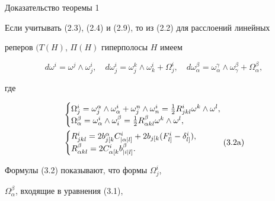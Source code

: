 \begin{pf*}{Доказательство теоремы 1} 


Если учитывать (2.3), (2.4) и (2.9), то из (2.2) для расслоений линейных 


реперов $(T(H)$, $\Pi(H)$ гиперполосы $H$ имеем 


\begin{equation} 


d\omega^i=\omega^j\wedge\omega^i_j,\quad 


d\omega^i_j=\omega^k_j\wedge\omega^i_k+\Omega^i_j,\quad 


d\omega^\beta_\alpha=\omega^\gamma_\alpha\wedge 


\omega^\beta_\gamma+\Omega^\beta_\alpha, 


\end{equation} 


где 


\begin{align} 


& 


\begin{cases} 


\Omega^i_j=\omega^\alpha_j\wedge\omega^i_\alpha+\omega^n_j\wedge 


\omega^i_n=\frac{1}{2} R^i_{jkl}\omega^k\wedge \omega^l, \\ 


\Omega^\beta_\alpha=\omega^i_\alpha\wedge\omega^\beta_i= 


\frac{1}{2}R^\beta_{\alpha kl}\omega^k\wedge \omega^l, 


\end{cases} 


\\ 


& 


\begin{cases} 


R^i_{jkl}=2b^\alpha_{j[k}C^i_{|\alpha|l]} 


+2b_{j[k}(F^i_{l]}-\delta^i_{l]}), \\ 


R^\beta_{\alpha kl}=2C^i_{\alpha[k}b^\beta_{|i|l]}. 


\end{cases} 


\tag{3.2\text{a}} 


\end{align} 


Формулы (3.2) показывают, что формы $\Omega^i_j$, 


$\Omega^\beta_\alpha$, входящие в уравнения (3.1), 



\end{pf*}
